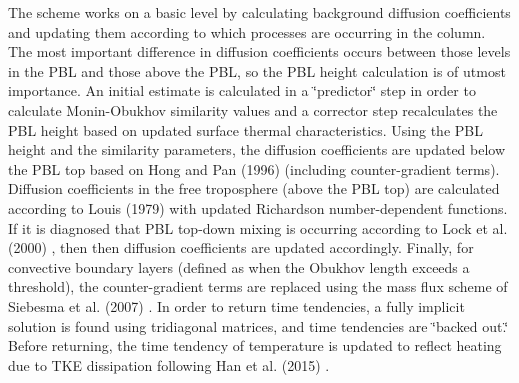 The scheme works on a basic level by calculating background diffusion coefficients and updating them according to which processes are occurring in the column. The most important difference in diffusion coefficients occurs between those levels in the P\+BL and those above the P\+BL, so the P\+BL height calculation is of utmost importance. An initial estimate is calculated in a \char`\"{}predictor\char`\"{} step in order to calculate Monin-\/\+Obukhov similarity values and a corrector step recalculates the P\+BL height based on updated surface thermal characteristics. Using the P\+BL height and the similarity parameters, the diffusion coefficients are updated below the P\+BL top based on Hong and Pan (1996) \cite{hong_and_pan_1996} (including counter-\/gradient terms). Diffusion coefficients in the free troposphere (above the P\+BL top) are calculated according to Louis (1979) \cite{louis_1979} with updated Richardson number-\/dependent functions. If it is diagnosed that P\+BL top-\/down mixing is occurring according to Lock et al. (2000) \cite{lock_et_al_2000} , then then diffusion coefficients are updated accordingly. Finally, for convective boundary layers (defined as when the Obukhov length exceeds a threshold), the counter-\/gradient terms are replaced using the mass flux scheme of Siebesma et al. (2007) \cite{siebesma_et_al_2007} . In order to return time tendencies, a fully implicit solution is found using tridiagonal matrices, and time tendencies are \char`\"{}backed out.\char`\"{} Before returning, the time tendency of temperature is updated to reflect heating due to T\+KE dissipation following Han et al. (2015) \cite{han_et_al_2015} .


